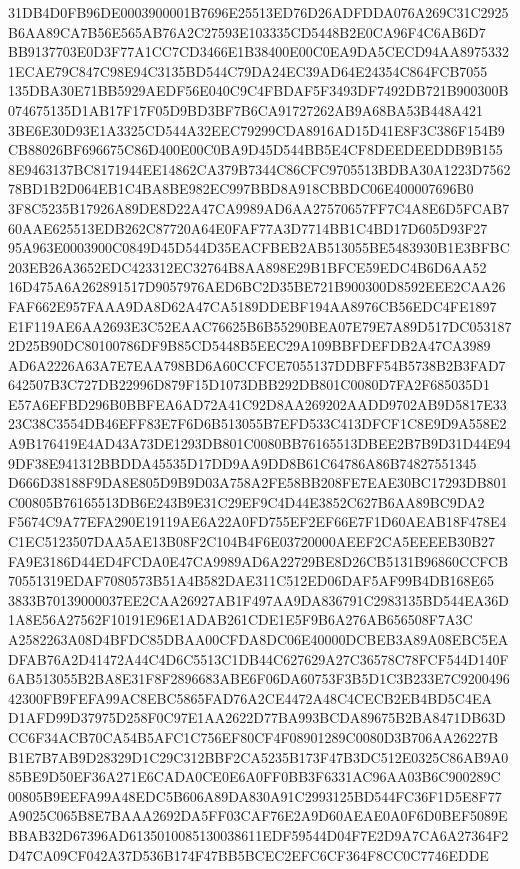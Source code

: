 \documentclass[UTF8,fontset=fandol,zihao=-4,a4paper]{ctexart}
\begin{document}
{{31DB4D0FB96DE0003900001B7696E25513ED76D26ADFDDA076A269C31C2925B6AA89CA7B56E565AB76A2C27593E103335CD5448B2E0CA96F4C6AB6D7
BB9137703E0D3F77A1CC7CD3466E1B38400E00C0EA9DA5CECD94AA89753321ECAE79C847C98E94C3135BD544C79DA24EC39AD64E24354C864FCB7055
135DBA30E71BB5929AEDF56E040C9C4FBDAF5F3493DF7492DB721B900300B074675135D1AB17F17F05D9BD3BF7B6CA91727262AB9A68BA53B448A421
3BE6E30D93E1A3325CD544A32EEC79299CDA8916AD15D41E8F3C386F154B9CB88026BF696675C86D400E00C0BA9D45D544BB5E4CF8DEEDEEDDB9B155
8E9463137BC8171944EE14862CA379B7344C86CFC9705513BDBA30A1223D756278BD1B2D064EB1C4BA8BE982EC997BBD8A918CBBDC06E400007696B0
3F8C5235B17926A89DE8D22A47CA9989AD6AA27570657FF7C4A8E6D5FCAB760AAE625513EDB262C87720A64E0FAF77A3D7714BB1C4BD17D605D93F27
95A963E0003900C0849D45D544D35EACFBEB2AB513055BE5483930B1E3BFBC203EB26A3652EDC423312EC32764B8AA898E29B1BFCE59EDC4B6D6AA52
16D475A6A262891517D9057976AED6BC2D35BE721B900300D8592EEE2CAA26FAF662E957FAAA9DA8D62A47CA5189DDEBF194AA8976CB56EDC4FE1897
E1F119AE6AA2693E3C52EAAC76625B6B55290BEA07E79E7A89D517DC0531872D25B90DC80100786DF9B85CD5448B5EEC29A109BBFDEFDB2A47CA3989
AD6A2226A63A7E7EAA798BD6A60CCFCE7055137DDBFF54B5738B2B3FAD7642507B3C727DB22996D879F15D1073DBB292DB801C0080D7FA2F685035D1
E57A6EFBD296B0BBFEA6AD72A41C92D8AA269202AADD9702AB9D5817E3323C38C3554DB46EFF83E7F6D6B513055B7EFD533C413DFCF1C8E9D9A558E2
A9B176419E4AD43A73DE1293DB801C0080BB76165513DBEE2B7B9D31D44E949DF38E941312BBDDA45535D17DD9AA9DD8B61C64786A86B74827551345
D666D38188F9DA8E805D9B9D03A758A2FE58BB208FE7EAE30BC17293DB801C00805B76165513DB6E243B9E31C29EF9C4D44E3852C627B6AA89BC9DA2
F5674C9A77EFA290E19119AE6A22A0FD755EF2EF66E7F1D60AEAB18F478E4C1EC5123507DAA5AE13B08F2C104B4F6E03720000AEEF2CA5EEEEB30B27
FA9E3186D44ED4FCDA0E47CA9989AD6A22729BE8D26CB5131B96860CCFCB70551319EDAF7080573B51A4B582DAE311C512ED06DAF5AF99B4DB168E65
3833B70139000037EE2CAA26927AB1F497AA9DA836791C2983135BD544EA36D1A8E56A27562F10191E96E1ADAB261CDE1E5F9B6A276AB656508F7A3C
A2582263A08D4BFDC85DBAA00CFDA8DC06E40000DCBEB3A89A08EBC5EADFAB76A2D41472A44C4D6C5513C1DB44C627629A27C36578C78FCF544D140F
6AB513055B2BA8E31F8F2896683ABE6F06DA60753F3B5D1C3B233E7C920049642300FB9FEFA99AC8EBC5865FAD76A2CE4472A48C4CECB2EB4BD5C4EA
D1AFD99D37975D258F0C97E1AA2622D77BA993BCDA89675B2BA8471DB63DCC6F34ACB70CA54B5AFC1C756EF80CF4F08901289C0080D3B706AA26227B
B1E7B7AB9D28329D1C29C312BBF2CA5235B173F47B3DC512E0325C86AB9A085BE9D50EF36A271E6CADA0CE0E6A0FF0BB3F6331AC96AA03B6C900289C
00805B9EEFA99A48EDC5B606A89DA830A91C2993125BD544FC36F1D5E8F77A9025C065B8E7BAAA2692DA5FF03CAF76E2A9D60AEAE0A0F6D0BEF5089E
BBAB32D67396AD6135010085130038611EDF59544D04F7E2D9A7CA6A27364F2D47CA09CF042A37D536B174F47BB5BCEC2EFC6CF364F8CC0C7746EDDE
}}
\end{document}
